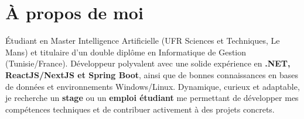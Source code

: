 \section{À propos de moi}
\resumeSubHeadingListStart
\item \small{
  Étudiant en Master Intelligence Artificielle (UFR Sciences et Techniques, Le Mans) et titulaire d’un double diplôme en Informatique de Gestion (Tunisie/France).  
  Développeur polyvalent avec une solide expérience en \textbf{.NET, ReactJS/NextJS et Spring Boot}, ainsi que de bonnes connaissances en bases de données et environnements Windows/Linux.  
  Dynamique, curieux et adaptable, je recherche un \textbf{stage} ou un \textbf{emploi étudiant} me permettant de développer mes compétences techniques et de contribuer activement à des projets concrets.
}
\resumeSubHeadingListEnd

